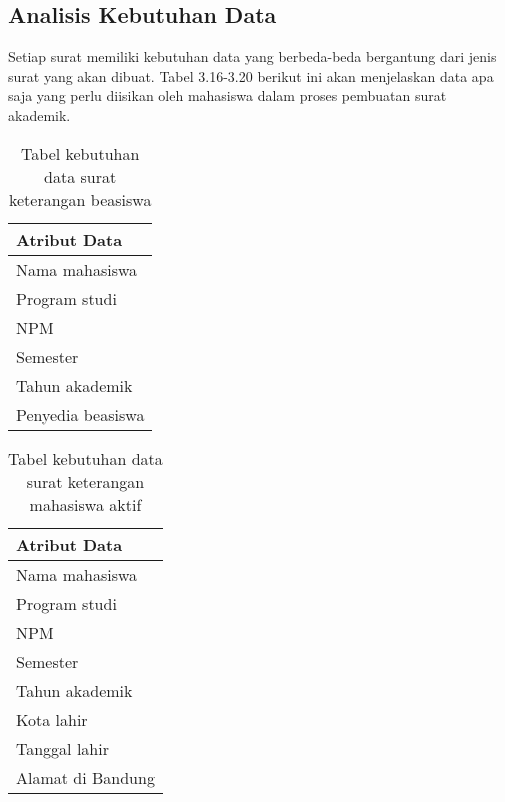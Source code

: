\subsection{Analisis Kebutuhan Data}
\label{sec:analisis_kebutuhan_data}
Setiap surat memiliki kebutuhan data yang berbeda-beda bergantung dari jenis surat yang akan dibuat. Tabel 3.16-3.20 berikut ini akan menjelaskan data apa saja yang perlu diisikan oleh mahasiswa dalam proses pembuatan surat akademik.\

\begin{table}[h]
\centering
\caption{Tabel kebutuhan data surat keterangan beasiswa}
\label{surat_keterangan_beasiswa}
\begin{tabular}{|l|}
\hline
\textbf{Atribut Data}                     \\ \hline
Nama mahasiswa                            \\ \hline 
Program studi                             \\ \hline 
NPM                             			\\ \hline
Semester			                        \\ \hline
Tahun akademik        			        \\ \hline
Penyedia beasiswa                         \\ \hline
\end{tabular}
\end{table}

\begin{table}[h]
\centering
\caption{Tabel kebutuhan data surat keterangan mahasiswa aktif}
\label{surat_keterangan_mahasiswa_aktif}
\begin{tabular}{|l|}
\hline
\textbf{Atribut Data}                     \\ \hline
Nama mahasiswa                            \\ \hline 
Program studi                             \\ \hline 
NPM                             			\\ \hline 
Semester                     				\\ \hline 
Tahun akademik                         	\\ \hline 
Kota lahir               					\\ \hline 
Tanggal lahir             				\\ \hline 
Alamat di Bandung                    		\\ \hline 
\end{tabular}
\end{table}

